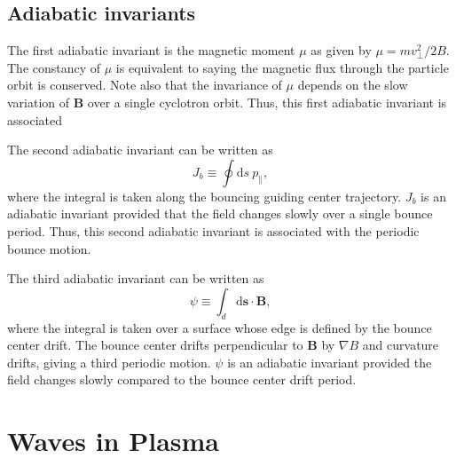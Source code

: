 	\subsection{Adiabatic invariants}

	The first adiabatic invariant is the magnetic moment $\mu$ as given by $\mu=mv_{\perp}^2/2B$. The constancy of $\mu$ is equivalent to saying the magnetic flux through the particle orbit is conserved. Note also that the invariance of $\mu$ depends on the slow variation of $\mathbf{B}$ over a single cyclotron orbit. Thus, this first adiabatic invariant is associated 

	The second adiabatic invariant can be written as 
	\begin{equation}
		J_b\equiv\oint\mathrm{d}s~p_{\parallel},
	\end{equation}
	where the integral is taken along the bouncing guiding center trajectory. $J_b$ is an adiabatic invariant provided that the field changes slowly over a single bounce period. Thus, this second adiabatic invariant is associated with the periodic bounce motion.

	The third adiabatic invariant can be written as 
	\begin{equation}
		\psi\equiv\int_d\mathrm{d}\mathbf{s}\cdot\mathbf{B},
	\end{equation}
	where the integral is taken over a surface whose edge is defined by the bounce center drift. The bounce center drifts perpendicular to $\mathbf{B}$ by $\nabla B$ and curvature drifts, giving a third periodic motion. $\psi$ is an adiabatic invariant provided the field changes slowly compared to the bounce center drift period.

\section{Waves in Plasma}

